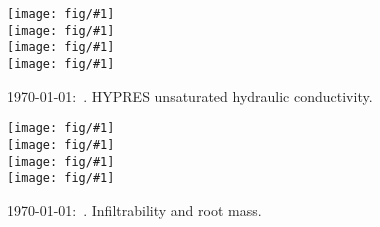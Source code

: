 \documentclass[a4paper]{article}
\newcommand{\figright}[1]{\texttt{[image: fig/\#1]}}
\newcommand{\figctop}[1]{\hspace*{-1cm}\figright{#1}}
\newcommand{\figc}[1]{\vspace*{-1.6cm}\figctop{#1}}
\newcommand{\MyID}{\today:~}
\begin{document}
\begin{figure}[htbp]
  \begin{center}
    \figctop{KM_L1} \\
    \figc{KM_L2} \\
    \figc{KM_L3} \\
    \figc{KM_L4}
  \end{center}
  \caption{\MyID{}. HYPRES unsaturated hydraulic conductivity.}
  \label{fig:KM}
\end{figure}

\begin{figure}[htbp]
  \begin{center}
    \figctop{K15_L1_root} \\
    \figc{K15_L2_root} \\
    \figc{K15_L3_root} \\
    \figc{K15_L4_root}
  \end{center}
  \caption{\MyID{}. Infiltrability and root mass.}
  \label{fig:K15root}
\end{figure}
\end{document}

